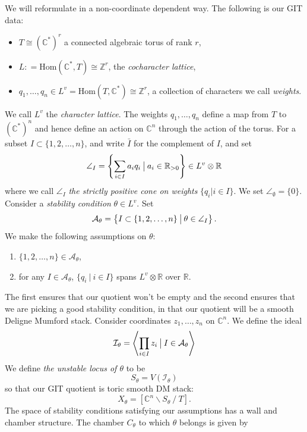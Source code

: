 \documentclass[oneside]{amsart}
\theoremstyle{definition}
\theoremstyle{definition}
\theoremstyle{definition}
\theoremstyle{definition}
\newcommand{\defeq}{\mathrel{\mathop:}=}
\newcommand{\CC}{\mathbb{C}}
\newcommand{\Z}{\mathbb{Z}}
\begin{document}
\newline
We will reformulate in a non-coordinate dependent way. The following is our GIT data:
\begin{itemize}
    \item $T \cong (\CC^*)^r$ a connected algebraic torus of rank $r$,
    \item $L \defeq \text{Hom}(\CC^*,T) \cong \Z^r$, the \textit{cocharacter lattice},
    \item $q_1, \dots, q_n \in L^v = \text{Hom}(T, \CC^*) \cong \Z^r $, a collection of characters we call \textit{weights}.
\end{itemize}
We call $L^v$ the \textit{character lattice}. The weights $q_1, \dots,q_n$ define a map from $T$ to $(\CC^*)^n$ and hence define an action on $\CC^n$ through the action of the torus. For a subset $I \subset \{1, 2, \dots , n\}$, and write $\bar{I}$ for the complement of $I$, and set
\begin{align}
    \angle_I =\left\{ \sum_{i\in I} a_i q_i \: \big{|} 
    \: a_i \in \mathbb{R}_{>0} \right\} \in L^v \otimes \mathbb{R}
\end{align}
where we call $\angle_I$ \textit{the strictly positive cone on weights} $\{q_i| i \in I \}$. We set $\angle_\emptyset = \{0 \}$. Consider a \textit{stability condition} $\theta \in L^v$. Set
$$
\mathcal{A}_\theta = \left\{ I \subset \{1,2,\dots,n \} \: \big{|} \: \theta \in \angle_{I}\right\}.
$$
We make the following assumptions on $\theta$:
\begin{enumerate}
    \item $\{1,2, \dots, n\} \in \mathcal{A}_\theta $,
    \item for any $I \in \mathcal{A}_\theta $, $\{q_i \: |\: i \in I \}$ spans $L^v \otimes \mathbb{R}$ over $\mathbb{R}.$
\end{enumerate}
The first ensures that our quotient won't be empty and the second ensures that we are picking a good stability condition, in that our quotient will be a smooth Deligne Mumford stack. Consider coordinates $z_1,\dots, z_n$ on $\CC^n$. We define the ideal 
$$
\mathcal{I}_{\theta} = \left\langle \prod_{i \in I} z_i  \: \big{|} \: I \in \mathcal{A}_{\theta} \right\rangle
$$
We define \textit{the unstable locus of $\theta$} to be 
$$
S_{\theta} = V(\mathcal{I}_{\theta})
$$
so that our GIT quotient is toric smooth DM stack:
$$
X_{\theta} = [ \CC^n \backslash S_\theta \: / \: T ].
$$
The space of stability conditions satisfying our assumptions has a wall and chamber structure. The chamber $C_\theta$ to which $\theta$ belongs is given by
\end{document}
